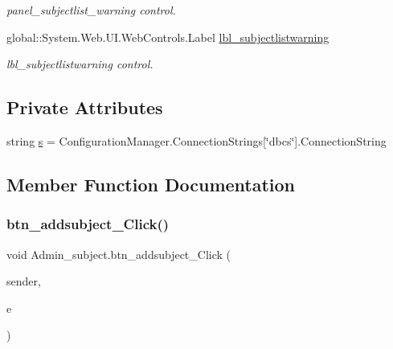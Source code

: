 \begin{DoxyCompactItemize}
\begin{DoxyCompactList}\small\item\em panel\+\_\+subjectlist\+\_\+warning control. \end{DoxyCompactList}\item 
global\+::\+System.\+Web.\+U\+I.\+Web\+Controls.\+Label \mbox{\hyperlink{class_admin__subject_a68f2389395ae842e18cf0ec9339b45a8}{lbl\+\_\+subjectlistwarning}}
\begin{DoxyCompactList}\small\item\em lbl\+\_\+subjectlistwarning control. \end{DoxyCompactList}\end{DoxyCompactItemize}
\subsection*{Private Attributes}
\begin{DoxyCompactItemize}
\item 
string \mbox{\hyperlink{class_admin__subject_ac0945297091deef9de3fd943432fc224}{s}} = Configuration\+Manager.\+Connection\+Strings\mbox{[}\char`\"{}dbcs\char`\"{}\mbox{]}.Connection\+String
\end{DoxyCompactItemize}


\subsection{Member Function Documentation}
\mbox{\label{class_admin__subject_a53842a13d43e75d65ac304479139aad3}} 
\subsubsection{\texorpdfstring{btn\_addsubject\_Click()}{btn\_addsubject\_Click()}}
{\footnotesize\ttfamily void Admin\+\_\+subject.\+btn\+\_\+addsubject\+\_\+\+Click (\begin{DoxyParamCaption}\item[{object}]{sender,  }\item[{Event\+Args}]{e }\end{DoxyParamCaption})\hspace{0.3cm}{\ttfamily [protected]}}

\mbox{\label{class_admin__subject_a906f8fd9b9274da7e385357b996d3a9c}} 
